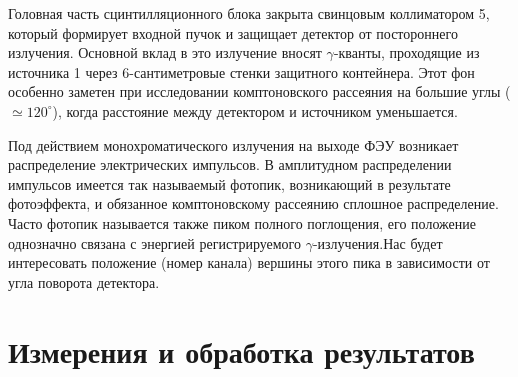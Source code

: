 \documentclass[a4paper,12pt]{article}
\begin{document}
 	Головная часть сцинтилляционного блока закрыта свинцовым коллиматором 5, который формирует входной пучок и защищает детектор от постороннего излучения. Основной вклад в это излучение вносят $\gamma$-кванты, проходящие из источника 1 через 6-сантиметровые стенки защитного контейнера. Этот фон особенно заметен при исследовании комптоновского рассеяния на большие углы ($\simeq 120^\circ$), когда расстояние между детектором и источником уменьшается.
 	
 	
 	Под действием монохроматического излучения на выходе ФЭУ возникает распределение электрических импульсов. В амплитудном распределении импульсов имеется так называемый фотопик, возникающий в результате фотоэффекта, и обязанное комптоновскому рассеянию сплошное распределение. Часто фотопик называется также пиком полного поглощения, его положение однозначно связана с энергией регистрируемого $\gamma$-излучения.Нас будет интересовать положение (номер канала) вершины этого пика в зависимости от угла поворота детектора.
	
	
\section{Измерения и обработка результатов} 
 
\end{document}
